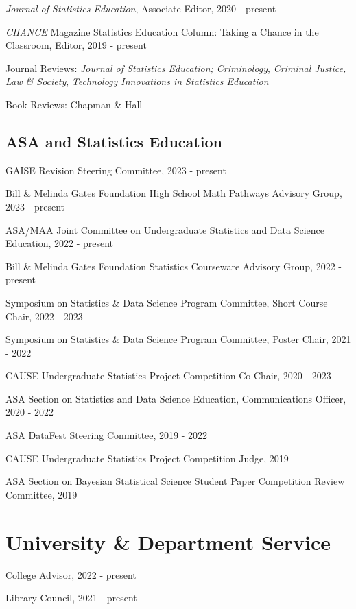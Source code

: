 \documentclass[11pt,dvipsnames]{article}
\begin{document}
\emph{Journal of Statistics Education}, Associate Editor, 2020 - present

\emph{CHANCE} Magazine Statistics Education Column: Taking a Chance in
the Classroom, Editor, 2019 - present

Journal Reviews: \emph{Journal of Statistics Education; Criminology},
\emph{Criminal Justice, Law \& Society}, \emph{Technology Innovations in
Statistics Education}

Book Reviews: Chapman \& Hall

\hypertarget{asa-and-statistics-education}{%
\subsection{ASA and Statistics
Education}\label{asa-and-statistics-education}}

GAISE Revision Steering Committee, 2023 - present

Bill \& Melinda Gates Foundation High School Math Pathways Advisory
Group, 2023 - present

ASA/MAA Joint Committee on Undergraduate Statistics and Data Science
Education, 2022 - present

Bill \& Melinda Gates Foundation Statistics Courseware Advisory Group,
2022 - present

Symposium on Statistics \& Data Science Program Committee, Short Course
Chair, 2022 - 2023

Symposium on Statistics \& Data Science Program Committee, Poster Chair,
2021 - 2022

CAUSE Undergraduate Statistics Project Competition Co-Chair, 2020 - 2023

ASA Section on Statistics and Data Science Education, Communications
Officer, 2020 - 2022

ASA DataFest Steering Committee, 2019 - 2022

CAUSE Undergraduate Statistics Project Competition Judge, 2019

ASA Section on Bayesian Statistical Science Student Paper Competition
Review Committee, 2019

\hypertarget{university-department-service}{%
\section{University \& Department
Service}\label{university-department-service}}

College Advisor, 2022 - present

Library Council, 2021 - present
\end{document}
